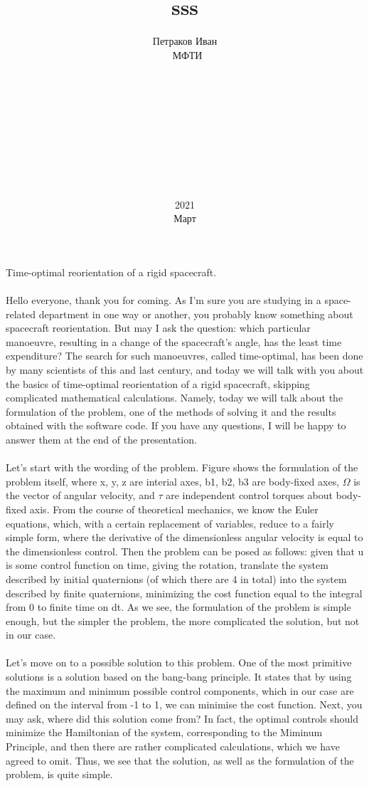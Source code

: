 \documentclass[12pt,a4paper, titlepage]{article}
\title{sss}
\date{2021\\Март}
\author{Петраков Иван\\\ МФТИ\\\\\\\\\\\\\\\\\\\\}
\begin{document}
Time-optimal reorientation of a rigid spacecraft.
\\
\\
Hello everyone, thank you for coming. As I'm sure you are studying in a space-related department in one way or another, you probably know something about spacecraft reorientation. But may I ask the question: which particular manoeuvre, resulting in a change of the spacecraft's angle, has the least time expenditure? The search for such manoeuvres, called time-optimal, has been done by many scientists of this and last century, and today we will talk with you about the basics of time-optimal reorientation of a rigid spacecraft, skipping complicated mathematical calculations. Namely, today we will talk about the formulation of the problem, one of the methods of solving it and the results obtained with the software code. If you have any questions, I will be happy to answer them at the end of the presentation.
\\
\\
Let's start with the wording of the problem. Figure shows the formulation of the problem itself, where x, y, z are interial axes, b1, b2, b3 are body-fixed axes, $\Omega$ is the vector of angular velocity, and $\tau$ are independent control torques about body-fixed axis. From the course of theoretical mechanics, we know the Euler equations, which, with a certain replacement of variables, reduce to a fairly simple form, where the derivative of the dimensionless angular velocity is equal to the dimensionless control. Then the problem can be posed as follows: given that u is some control function on time, giving the rotation, translate the system described by initial quaternions (of which there are 4 in total) into the system described by finite quaternions, minimizing the cost function equal to the integral from 0 to finite time on dt. As we see, the formulation of the problem is simple enough, but the simpler the problem, the more complicated the solution, but not in our case.
\\
\\
Let's move on to a possible solution to this problem. One of the most primitive solutions is a solution based on the bang-bang principle. It states that by using the maximum and minimum possible control components, which in our case are defined on the interval from -1 to 1, we can minimise the cost function. Next, you may ask, where did this solution come from? In fact, the optimal controls should minimize the Hamiltonian of the system, corresponding to the Miminum Principle, and then there are rather complicated calculations, which we have agreed to omit. Thus, we see that the solution, as well as the formulation of the problem, is quite simple.
\end{document}
